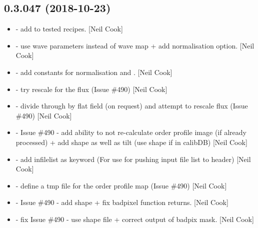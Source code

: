 \documentclass[a4paper,10pt,english]{report}
\begin{document}
\subsection{0.3.047 (2018-10-23)}
\label{\detokenize{misc/changelog:id284}}\begin{itemize}
\item {} 
 - add  to tested recipes. {[}Neil Cook{]}

\item {} 
 - use wave parameters instead of wave map +
add normalisation option. {[}Neil Cook{]}

\item {} 
 - add constants for normalisation and
. {[}Neil Cook{]}

\item {} 
 - try rescale for the flux (Issue \#490) {[}Neil
Cook{]}

\item {} 
 - divide through by flat field (on request) and
attempt to rescale flux (Issue \#490) {[}Neil Cook{]}

\item {} 
 - Issue \#490 - add ability to not re-calculate
order profile image (if already processed) + add shape as well as tilt
(use shape if in calibDB) {[}Neil Cook{]}

\item {} 
 - add infilelist as keyword (For use for pushing
input file list to header) {[}Neil Cook{]}

\item {} 
 - define a tmp file for the order profile map (Issue
\#490) {[}Neil Cook{]}

\item {} 
 - Issue \#490 - add shape + fix badpixel function
returns. {[}Neil Cook{]}

\item {} 
 - fix Issue \#490 - use shape file + correct
output of badpix mask. {[}Neil Cook{]}

\end{itemize}
\end{document}
